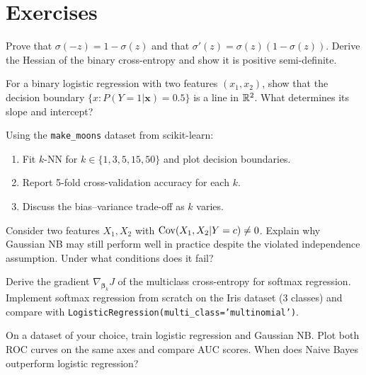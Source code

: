 \section{Exercises}

\begin{exercise}
Prove that $\sigma(-z) = 1 - \sigma(z)$ and that $\sigma'(z) = \sigma(z)(1-\sigma(z))$. Derive the Hessian of the binary cross-entropy and show it is positive semi-definite.
\end{exercise}

\begin{exercise}
For a binary logistic regression with two features $(x_1,x_2)$, show that the decision boundary $\{x : P(Y=1|\bm{x})=0.5\}$ is a line in $\mathbb{R}^2$. What determines its slope and intercept?
\end{exercise}

\begin{exercise}[$k$-NN Experiments]
Using the \texttt{make\_moons} dataset from scikit-learn:
\begin{enumerate}
    \item Fit $k$-NN for $k \in \{1, 3, 5, 15, 50\}$ and plot decision boundaries.
    \item Report 5-fold cross-validation accuracy for each $k$.
    \item Discuss the bias--variance trade-off as $k$ varies.
\end{enumerate}
\end{exercise}

\begin{exercise}
Consider two features $X_1, X_2$ with $\mathrm{Cov}(X_1,X_2|Y=c) \neq 0$. Explain why Gaussian NB may still perform well in practice despite the violated independence assumption. Under what conditions does it fail?
\end{exercise}

\begin{exercise}
Derive the gradient $\nabla_{\bm{\beta}_k} J$ of the multiclass cross-entropy for softmax regression. Implement softmax regression from scratch on the Iris dataset (3 classes) and compare with \texttt{LogisticRegression(multi\_class='multinomial')}.
\end{exercise}

\begin{exercise}
On a dataset of your choice, train logistic regression and Gaussian NB. Plot both ROC curves on the same axes and compare AUC scores. When does Naive Bayes outperform logistic regression?
\end{exercise}

